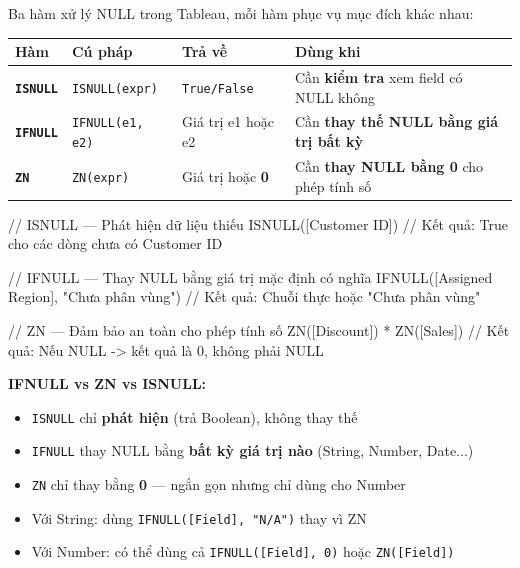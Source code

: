 \documentclass[12pt]{article}
\begin{document}
\noindent Ba hàm xử lý NULL trong Tableau, mỗi hàm phục vụ mục đích khác nhau:

\begin{center}
\renewcommand{\arraystretch}{1.4}
\begin{tabularx}{\linewidth}{l l l X}
\toprule
\textbf{Hàm} & \textbf{Cú pháp} & \textbf{Trả về} & \textbf{Dùng khi} \\
\midrule
\textbf{\texttt{ISNULL}} & \texttt{ISNULL(expr)} & \texttt{True/False} & Cần \textbf{kiểm tra} xem field có NULL không \\
\textbf{\texttt{IFNULL}} & \texttt{IFNULL(e1, e2)} & Giá trị e1 hoặc e2 & Cần \textbf{thay thế NULL bằng giá trị bất kỳ} \\
\textbf{\texttt{ZN}} & \texttt{ZN(expr)} & Giá trị hoặc \textbf{0} & Cần \textbf{thay NULL bằng 0} cho phép tính số \\
\bottomrule
\end{tabularx}
\end{center}

\begin{aivncodebox}[]
\begin{python}
// ISNULL — Phát hiện dữ liệu thiếu
ISNULL([Customer ID])
// Kết quả: True cho các dòng chưa có Customer ID

// IFNULL — Thay NULL bằng giá trị mặc định có nghĩa
IFNULL([Assigned Region], "Chưa phân vùng")
// Kết quả: Chuỗi thực hoặc "Chưa phân vùng"

// ZN — Đảm bảo an toàn cho phép tính số
ZN([Discount]) * ZN([Sales])
// Kết quả: Nếu NULL -> kết quả là 0, không phải NULL
\end{python}
\end{aivncodebox}

\begin{notebox}
\textbf{IFNULL vs ZN vs ISNULL:}
\begin{itemize}[nosep]
    \item \texttt{ISNULL} chỉ \textbf{phát hiện} (trả Boolean), không thay thế
    \item \texttt{IFNULL} thay NULL bằng \textbf{bất kỳ giá trị nào} (String, Number, Date...)
    \item \texttt{ZN} chỉ thay bằng \textbf{0} --- ngắn gọn nhưng chỉ dùng cho Number
    \item Với String: dùng \texttt{IFNULL([Field], "N/A")} thay vì ZN
    \item Với Number: có thể dùng cả \texttt{IFNULL([Field], 0)} hoặc \texttt{ZN([Field])}
\end{itemize}
\end{notebox}
\end{document}
